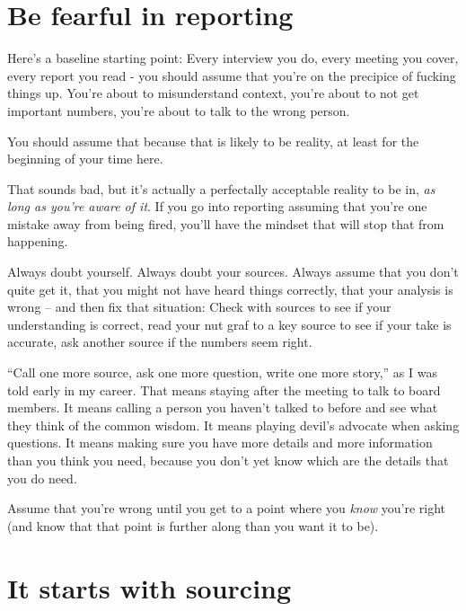 \documentclass[
  12pt,
  american,
  letterpaperpaper,
  extrafontsizes,onecolumn,openright
  ]{memoir}
\newlength{\rf}
\begin{document}
\hypertarget{be-fearful-in-reporting}{%
\section*{Be fearful in reporting}\label{be-fearful-in-reporting}}

Here's a baseline starting point: Every interview you do, every meeting you cover, every report you read - you should assume that you're on the precipice of fucking things up. You're about to misunderstand context, you're about to not get important numbers, you're about to talk to the wrong person.

You should assume that because that is likely to be reality, at least for the beginning of your time here.

That sounds bad, but it's actually a perfectally acceptable reality to be in, \emph{as long as you're aware of it}. If you go into reporting assuming that you're one mistake away from being fired, you'll have the mindset that will stop that from happening.

Always doubt yourself. Always doubt your sources. Always assume that you don't quite get it, that you might not have heard things correctly, that your analysis is wrong -- and then fix that situation: Check with sources to see if your understanding is correct, read your nut graf to a key source to see if your take is accurate, ask another source if the numbers seem right.

\enquote{Call one more source, ask one more question, write one more story,} as I was told early in my career. That means staying after the meeting to talk to board members. It means calling a person you haven't talked to before and see what they think of the common wisdom. It means playing devil's advocate when asking questions. It means making sure you have more details and more information than you think you need, because you don't yet know which are the details that you do need.

Assume that you're wrong until you get to a point where you \emph{know} you're right (and know that that point is further along than you want it to be).

\hypertarget{it-starts-with-sourcing}{%
\section*{It starts with sourcing}\label{it-starts-with-sourcing}}
\end{document}
